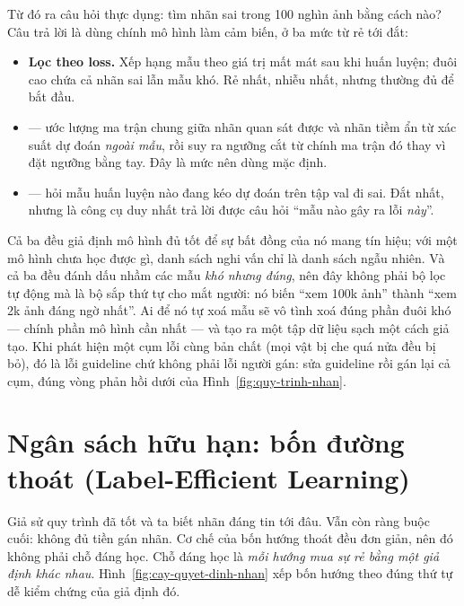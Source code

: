 \documentclass[../../deep_learning.tex]{subfiles}
\begin{document}
Từ đó ra câu hỏi thực dụng: tìm nhãn sai trong 100 nghìn ảnh bằng cách nào? Câu trả lời là dùng chính mô hình làm cảm biến, ở ba mức từ rẻ tới đắt:
\begin{itemize}
\item \textbf{Lọc theo loss.} Xếp hạng mẫu theo giá trị mất mát sau khi huấn luyện; đuôi cao chứa cả nhãn sai lẫn mẫu khó. Rẻ nhất, nhiễu nhất, nhưng thường đủ để bắt đầu.
\item \textbf{} \cite{northcutt2021confident} --- ước lượng ma trận chung giữa nhãn quan sát được và nhãn tiềm ẩn từ xác suất dự đoán \emph{ngoài mẫu}, rồi suy ra ngưỡng cắt từ chính ma trận đó thay vì đặt ngưỡng bằng tay. Đây là mức nên dùng mặc định.
\item \textbf{} --- hỏi mẫu huấn luyện nào đang kéo dự đoán trên tập val đi sai. Đắt nhất, nhưng là công cụ duy nhất trả lời được câu hỏi ``mẫu nào gây ra lỗi \emph{này}''.
\end{itemize}
Cả ba đều giả định mô hình đủ tốt để sự bất đồng của nó mang tín hiệu; với một mô hình chưa học được gì, danh sách nghi vấn chỉ là danh sách ngẫu nhiên. Và cả ba đều đánh dấu nhầm các mẫu \emph{khó nhưng đúng}, nên đây không phải bộ lọc tự động mà là bộ sắp thứ tự cho mắt người: nó biến ``xem 100k ảnh'' thành ``xem 2k ảnh đáng ngờ nhất''. Ai để nó tự xoá mẫu sẽ vô tình xoá đúng phần đuôi khó --- chính phần mô hình cần nhất --- và tạo ra một tập dữ liệu sạch một cách giả tạo. Khi phát hiện một cụm lỗi cùng bản chất (mọi vật bị che quá nửa đều bị bỏ), đó là lỗi guideline chứ không phải lỗi người gán: sửa guideline rồi gán lại cả cụm, đúng vòng phản hồi dưới của Hình~\ref{fig:quy-trinh-nhan}.

\section{Ngân sách hữu hạn: bốn đường thoát (Label-Efficient Learning)}
Giả sử quy trình đã tốt và ta biết nhãn đáng tin tới đâu. Vẫn còn ràng buộc cuối: không đủ tiền gán nhãn. Cơ chế của bốn hướng thoát đều đơn giản, nên đó không phải chỗ đáng học. Chỗ đáng học là \emph{mỗi hướng mua sự rẻ bằng một giả định khác nhau}. Hình~\ref{fig:cay-quyet-dinh-nhan} xếp bốn hướng theo đúng thứ tự dễ kiểm chứng của giả định đó.
\end{document}
